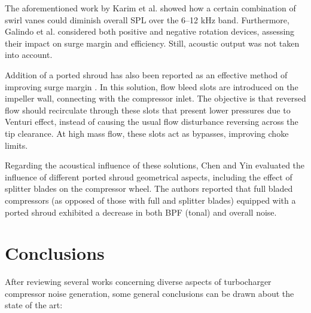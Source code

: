 The aforementioned work by Karim et al. \cite{karim2013computational} showed how a certain combination of swirl vanes could diminish overall SPL over the 6--12 kHz band. Furthermore, Galindo et al. \cite{galindo2007potential} considered both positive and negative rotation devices, assessing their impact on surge margin and efficiency. Still, acoustic output was not taken into account.

Addition of a ported shroud has also been reported as an effective method of improving surge margin \cite{guillou2010characterization,semlitsch2014numerical}. In this solution, flow bleed slots are introduced on the impeller wall, connecting with the compressor inlet. The objective is that reversed flow should recirculate through these slots that present lower pressures due to Venturi effect, instead of causing the usual flow disturbance reversing across the tip clearance. At high mass flow, these slots act as bypasses, improving choke limits. 

Regarding the acoustical influence of these solutions, Chen and Yin \cite{chen2006turboc} evaluated the influence of different ported shroud geometrical aspects, including the effect of splitter blades on the compressor wheel. The authors reported that full bladed compressors (as opposed of those with full and splitter blades) equipped with a ported shroud exhibited a decrease in both BPF (tonal) and overall noise.

\section{Conclusions}

After reviewing several works concerning diverse aspects of turbocharger compressor noise generation, some general conclusions can be drawn about the state of the art:

